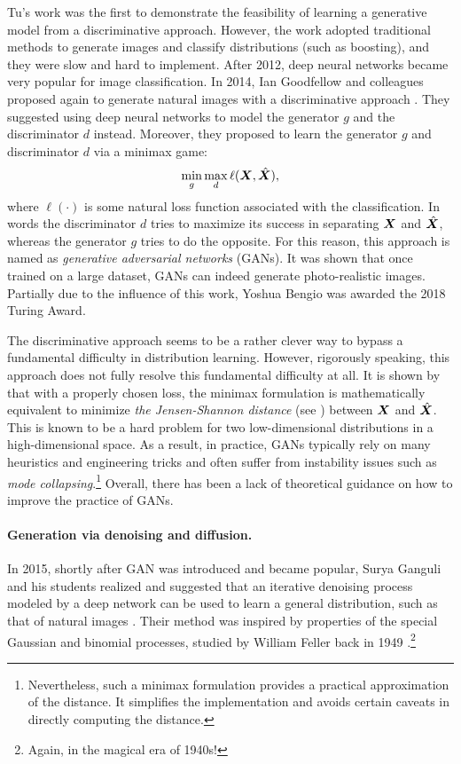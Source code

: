 \documentclass[\toplevelprefix/book-main.tex]{subfiles}
\begin{document}
Tu's work \cite{Tu-2007} was the first to demonstrate the feasibility of learning a generative model from a discriminative approach. However, the work adopted traditional methods to generate images and classify distributions (such as boosting), and they were slow and hard to implement. After 2012, deep neural networks became very popular for image classification. In 2014, Ian Goodfellow and colleagues proposed again to generate natural images with a discriminative approach \cite{Goodfellow-2014}. They suggested using deep neural networks to model the generator $g$ and the discriminator $d$ instead. Moreover, they proposed to learn the generator $g$ and discriminator $d$ via a minimax game:
\begin{equation}
    \min_g \max_d \ell(\bm{X}, \hat {\bm{X}}),
\end{equation}
where $\ell(\cdot)$ is some natural loss function associated with the classification.  In words the discriminator $d$ tries to maximize its success in separating $\bm{X}$ and $\hat {\bm{X}}$, whereas the generator $g$ tries to do the opposite. For this reason, this approach is named as {\em generative adversarial networks} (GANs). It was shown that once trained on a large dataset, GANs can indeed generate photo-realistic images. Partially due to the influence of this work, Yoshua Bengio was awarded the 2018 Turing Award.

The discriminative approach seems to be a rather clever way to bypass a fundamental difficulty in distribution learning. However, rigorously speaking, this approach does not fully resolve this fundamental difficulty at all. It is shown by  \cite{Goodfellow-2014} that with a properly chosen loss, the minimax formulation is mathematically equivalent to minimize {\em the Jensen-Shannon distance} (see \cite{Cover-Thomas}) between $\bm{X}$ and $\hat {\bm{X}}$. This is known to be a hard problem for two low-dimensional distributions in a high-dimensional space. As a result, in practice, GANs typically rely on many heuristics and engineering tricks and often suffer from instability issues such as {\em mode collapsing}.\footnote{Nevertheless, such a minimax formulation provides a practical approximation of the distance. It simplifies the implementation and avoids certain caveats in directly computing the distance.} Overall, there has been a lack of theoretical guidance on how to improve the practice of GANs.

\paragraph{Generation via denoising and diffusion.}
In 2015, shortly after GAN was introduced and became popular, Surya Ganguli and his students realized and suggested that an iterative denoising process modeled by a deep network can be used to learn a general distribution, such as that of natural images \cite{Sohl-Dickstein2015}. Their method was inspired by properties of the special Gaussian and binomial processes, studied by William Feller back in 1949 \cite{Feller1949OnTT}.\footnote{Again, in the magical era of 1940s!} 
\end{document}
